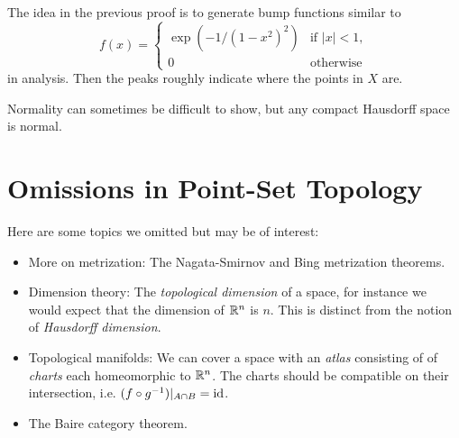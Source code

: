 \begin{remark}
  The idea in the previous proof is to generate
  bump functions similar to
  \[
    f(x) =
    \begin{cases}
      \exp(-1 / (1 - x^2)^2) & \text{if } |x| < 1, \\
      0 & \text{otherwise}
    \end{cases}
  \]
  in analysis. Then the peaks roughly indicate where
  the points in $X$ are.
\end{remark}

\begin{remark}
  Normality can sometimes be difficult to show, but
  any compact Hausdorff space is normal.
\end{remark}

\section{Omissions in Point-Set Topology}
Here are some topics we omitted but may be of
interest:
\begin{itemize}
  \item More on metrization:
    The Nagata-Smirnov and Bing metrization theorems.
  \item Dimension theory: The \emph{topological dimension}
    of a space, for instance we would expect that
    the dimension of $\mathbb{R}^n$ is $n$. This is distinct
    from the notion of \emph{Hausdorff dimension}.
  \item Topological manifolds: We can cover
    a space with an \emph{atlas} consisting
    of of \emph{charts}
    each homeomorphic to $\mathbb{R}^n$. The charts should
    be compatible on their intersection, i.e.
    $(f \circ g^{-1})|_{A \cap B} = \operatorname{id}$.
  \item The Baire category theorem.
\end{itemize}
